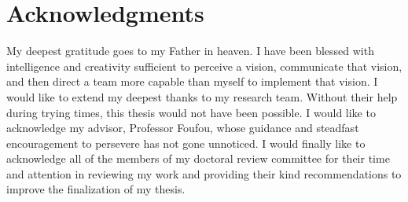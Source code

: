 \chapter*{Acknowledgments}

My deepest gratitude goes to my Father in heaven.  I have been blessed with intelligence and creativity sufficient to perceive a vision, communicate that vision, and then direct a team more capable than myself to implement that vision.  I would like to extend my deepest thanks to my research team. Without their help during trying times, this thesis would not have been possible. I would like to acknowledge my advisor, Professor Foufou, whose guidance and steadfast encouragement to persevere has not gone unnoticed. I would finally like to acknowledge all of the members of my doctoral review committee for their time and attention in reviewing my work and providing their kind recommendations to improve the finalization of my thesis.

